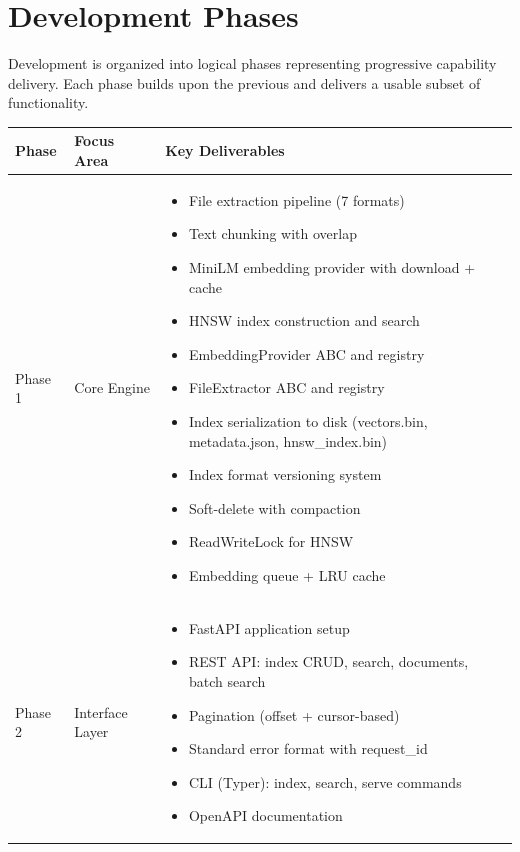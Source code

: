 \documentclass[11pt,a4paper]{article}
\begin{document}
\section{Development Phases}

Development is organized into logical phases representing progressive capability delivery. Each phase builds upon the previous and delivers a usable subset of functionality.

\begin{reqbox}
\begin{longtable}{@{}p{2.5cm}p{3.5cm}p{8.5cm}@{}}
\toprule
\textbf{Phase} & \textbf{Focus Area} & \textbf{Key Deliverables} \\
\midrule
\endhead
Phase 1 & Core Engine &
\begin{itemize}[nosep]
    \item File extraction pipeline (7 formats)
    \item Text chunking with overlap
    \item MiniLM embedding provider with download + cache
    \item HNSW index construction and search
    \item EmbeddingProvider ABC and registry
    \item FileExtractor ABC and registry
    \item Index serialization to disk (vectors.bin, metadata.json, hnsw\_index.bin)
    \item Index format versioning system
    \item Soft-delete with compaction
    \item ReadWriteLock for HNSW
    \item Embedding queue + LRU cache
\end{itemize} \\
\midrule
Phase 2 & Interface Layer &
\begin{itemize}[nosep]
    \item FastAPI application setup
    \item REST API: index CRUD, search, documents, batch search
    \item Pagination (offset + cursor-based)
    \item Standard error format with request\_id
    \item CLI (Typer): index, search, serve commands
    \item OpenAPI documentation

\end{itemize}
\end{longtable}
\end{reqbox}
\end{document}
